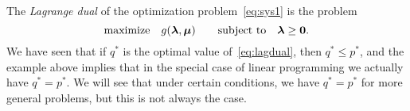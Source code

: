 The {\em Lagrange dual} of the optimization problem~\eqref{eq:sys1} is the problem
\begin{equation}\label{eq:lagdual}
 \text{maximize}\quad g(\bm{\lambda},\bm{\mu}) \quad \quad\text{subject to}\quad \bm{\lambda}\geq \bm{0}.
\end{equation}
We have seen that if $q^*$ is the optimal value of~\eqref{eq:lagdual}, then $q^*\leq p^*$, and the example above implies that in the special case of linear programming we actually have $q^*=p^*$. We will see that under certain conditions, we have $q^*=p^*$ for more general problems, but this is not always the case.


